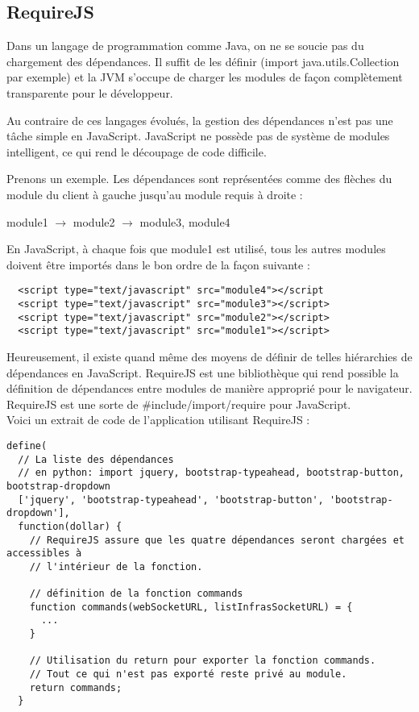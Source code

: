 \subsection{RequireJS}

Dans un langage de programmation comme Java, on ne se soucie pas du chargement
des dépendances. Il suffit de les définir (import java.utils.Collection par
exemple) et la JVM s'occupe de charger les modules de façon complètement
transparente pour le développeur.

Au contraire de ces langages évolués, la gestion des dépendances n'est pas
une tâche simple en JavaScript.
JavaScript ne possède pas de système de modules intelligent, ce qui rend le
découpage de code difficile.

Prenons un exemple. Les dépendances sont représentées comme des flèches du
module du client à gauche jusqu'au module requis à droite :

module1 $\rightarrow$ module2 $\rightarrow$ module3, module4 

En JavaScript, à chaque fois que module1 est utilisé, tous les autres modules
doivent être importés dans le bon ordre de la façon suivante :
\lstset{language=XML}
\begin{lstlisting}
  <script type="text/javascript" src="module4"></script
  <script type="text/javascript" src="module3"></script>
  <script type="text/javascript" src="module2"></script>
  <script type="text/javascript" src="module1"></script>
\end{lstlisting}

Heureusement, il existe quand même des moyens de définir de telles hiérarchies de
dépendances en JavaScript. RequireJS est une bibliothèque qui rend possible la
définition de dépendances entre modules de manière approprié pour le navigateur.
RequireJS est une sorte de \#include/import/require pour JavaScript.\\
Voici un extrait de code de l'application utilisant RequireJS :
\lstset{language=JavaScript}
\begin{lstlisting}[caption=Définition du module commands avec RequireJS]
  define(
  // La liste des dépendances 
  // en python: import jquery, bootstrap-typeahead, bootstrap-button, bootstrap-dropdown
  ['jquery', 'bootstrap-typeahead', 'bootstrap-button', 'bootstrap-dropdown'], 
  function(dollar) { 
    // RequireJS assure que les quatre dépendances seront chargées et accessibles à
    // l'intérieur de la fonction.
    
    // définition de la fonction commands
    function commands(webSocketURL, listInfrasSocketURL) = {
      ...
    }
    
    // Utilisation du return pour exporter la fonction commands.
    // Tout ce qui n'est pas exporté reste privé au module.
    return commands;
  }
\end{lstlisting}



